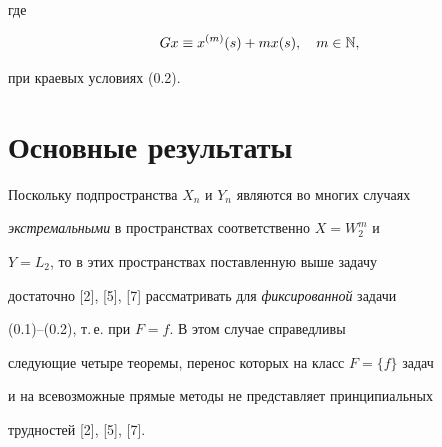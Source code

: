 где


\begin{equation}


Gx \equiv x^{(m)}(s) + mx(s),\quad m\in\N,


\end{equation}


при краевых условиях (0.2).





\section{Основные результаты}





Поскольку подпространства $X_n$ и $Y_n$ являются во многих случаях


{\it экстремальными} в пространствах соответственно $X = W_2^m$ и


$Y=L_2$, то в этих пространствах поставленную выше задачу


достаточно [2], [5], [7] рассматривать для {\it фиксированной} задачи


(0.1)--(0.2), т.\,е. при $F = f$. В этом случае справедливы


следующие четыре теоремы, перенос которых на класс $F=\{f\}$ задач


и на всевозможные прямые методы не представляет принципиальных


трудностей [2], [5], [7].





